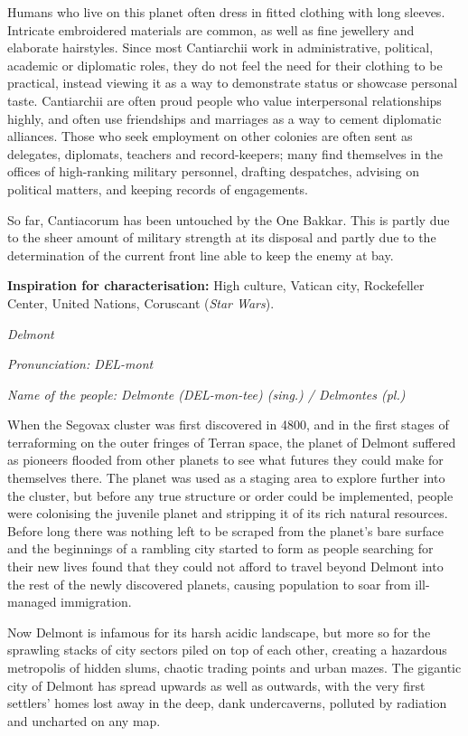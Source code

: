 \documentclass{scrbook}
\begin{document}
Humans who live on this planet often dress in fitted clothing with long sleeves. Intricate embroidered materials are common, as well as fine jewellery and elaborate hairstyles. Since most Cantiarchii work in administrative, political, academic or diplomatic roles, they do not feel the need for their clothing to be practical, instead viewing it as a way to demonstrate status or showcase personal taste. Cantiarchii are often proud people who value interpersonal relationships highly, and often use friendships and marriages as a way to cement diplomatic alliances. Those who seek employment on other colonies are often sent as delegates, diplomats, teachers and record-keepers; many find themselves in the offices of high-ranking military personnel, drafting despatches, advising on political matters, and keeping records of engagements.

So far, Cantiacorum has been untouched by the One Bakkar. This is partly due to the sheer amount of military strength at its disposal and partly due to the determination of the current front line able to keep the enemy at bay.

\textbf{Inspiration for characterisation:} High culture, Vatican city, Rockefeller Center, United Nations, Coruscant (\textit{Star Wars}).

\textit{Delmont}

\textit{Pronunciation: DEL-mont}

\textit{Name of the people: Delmonte (DEL-mon-tee) (sing.) / Delmontes (pl.)}

When the Segovax cluster was first discovered in 4800, and in the first stages of terraforming on the outer fringes of Terran space, the planet of Delmont suffered as pioneers flooded from other planets to see what futures they could make for themselves there. The planet was used as a staging area to explore further into the cluster, but before any true structure or order could be implemented, people were colonising the juvenile planet and stripping it of its rich natural resources. Before long there was nothing left to be scraped from the planet's bare surface and the beginnings of a rambling city started to form as people searching for their new lives found that they could not afford to travel beyond Delmont into the rest of the newly discovered planets, causing population to soar from ill-managed immigration.

Now Delmont is infamous for its harsh acidic landscape, but more so for the sprawling stacks of city sectors piled on top of each other, creating a hazardous metropolis of hidden slums, chaotic trading points and urban mazes. The gigantic city of Delmont has spread upwards as well as outwards, with the very first settlers' homes lost away in the deep, dank undercaverns, polluted by radiation and uncharted on any map.
\end{document}
